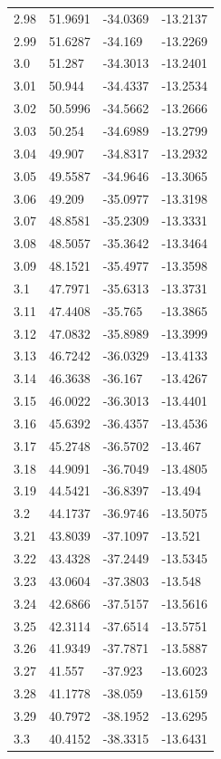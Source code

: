 \begin{tabular}{llll}
2.98 & 51.9691 & -34.0369 & -13.2137 \\
2.99 & 51.6287 & -34.169 & -13.2269 \\
3.0 & 51.287 & -34.3013 & -13.2401 \\
3.01 & 50.944 & -34.4337 & -13.2534 \\
3.02 & 50.5996 & -34.5662 & -13.2666 \\
3.03 & 50.254 & -34.6989 & -13.2799 \\
3.04 & 49.907 & -34.8317 & -13.2932 \\
3.05 & 49.5587 & -34.9646 & -13.3065 \\
3.06 & 49.209 & -35.0977 & -13.3198 \\
3.07 & 48.8581 & -35.2309 & -13.3331 \\
3.08 & 48.5057 & -35.3642 & -13.3464 \\
3.09 & 48.1521 & -35.4977 & -13.3598 \\
3.1 & 47.7971 & -35.6313 & -13.3731 \\
3.11 & 47.4408 & -35.765 & -13.3865 \\
3.12 & 47.0832 & -35.8989 & -13.3999 \\
3.13 & 46.7242 & -36.0329 & -13.4133 \\
3.14 & 46.3638 & -36.167 & -13.4267 \\
3.15 & 46.0022 & -36.3013 & -13.4401 \\
3.16 & 45.6392 & -36.4357 & -13.4536 \\
3.17 & 45.2748 & -36.5702 & -13.467 \\
3.18 & 44.9091 & -36.7049 & -13.4805 \\
3.19 & 44.5421 & -36.8397 & -13.494 \\
3.2 & 44.1737 & -36.9746 & -13.5075 \\
3.21 & 43.8039 & -37.1097 & -13.521 \\
3.22 & 43.4328 & -37.2449 & -13.5345 \\
3.23 & 43.0604 & -37.3803 & -13.548 \\
3.24 & 42.6866 & -37.5157 & -13.5616 \\
3.25 & 42.3114 & -37.6514 & -13.5751 \\
3.26 & 41.9349 & -37.7871 & -13.5887 \\
3.27 & 41.557 & -37.923 & -13.6023 \\
3.28 & 41.1778 & -38.059 & -13.6159 \\
3.29 & 40.7972 & -38.1952 & -13.6295 \\
3.3 & 40.4152 & -38.3315 & -13.6431 \\

\end{tabular}
